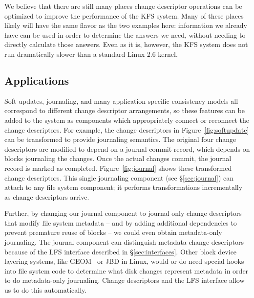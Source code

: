 We believe that there are still many places change descriptor operations can be
optimized to improve the performance of the KFS system. Many of these places
likely will have the same flavor as the two examples here: information we
already have can be used in order to determine the answers we need, without
needing to directly calculate those answers. Even as it is, however, the KFS
system does not run dramatically slower than a standard Linux 2.6 kernel.

\subsection {Applications}
Soft updates, journaling, and many application-specific consistency models all
correspond to different change descriptor arrangements, so these features can be
added to the system as components which appropriately connect or reconnect the
change descriptors. For example, the change descriptors in
Figure~\ref{fig:softupdate} can be transformed to provide journaling semantics.
The original four change descriptors are modified to depend on a journal commit
record, which depends on blocks journaling the changes. Once the actual changes
commit, the journal record is marked as completed. Figure~\ref{fig:journal}
shows these transformed change descriptors. This single journaling component
(see \S\ref{sec:journal}) can attach to any file system component; it performs
transformations incrementally as change descriptors arrive.

Further, by changing our journal component to journal only change descriptors
that modify file system metadata -- and by adding additional dependencies to
prevent premature reuse of blocks -- we could even obtain metadata-only
journaling. The journal component can distinguish metadata change descriptors
because of the LFS interface described in \S\ref{sec:interfaces}. Other block
device layering systems, like GEOM~\cite{geom} or JBD in Linux, would or do need
special hooks into file system code to determine what disk changes represent
metadata in order to do metadata-only journaling. Change descriptors and the LFS
interface allow us to do this automatically.

